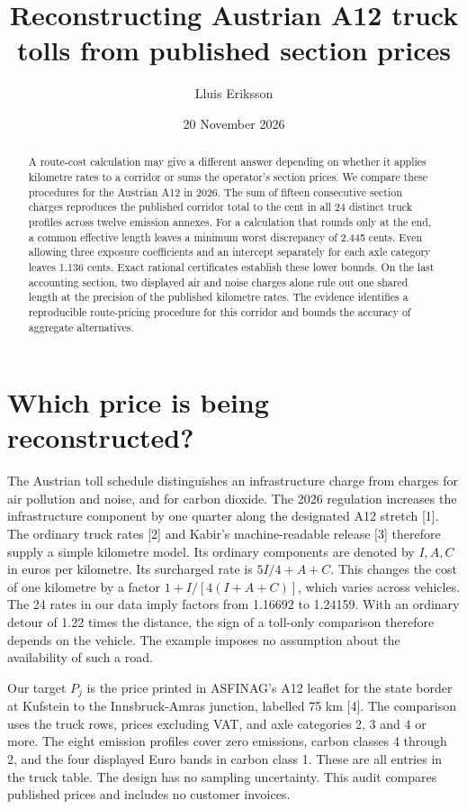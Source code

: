 \documentclass[11pt]{article}
\title{Reconstructing Austrian A12 truck tolls from published section prices}
\author{Lluis Eriksson}
\date{20 November 2026}
\begin{document}
\maketitle
\begin{abstract}
A route-cost calculation may give a different answer depending on whether it applies kilometre rates to a corridor or sums the operator's section prices. We compare these procedures for the Austrian A12 in 2026. The sum of fifteen consecutive section charges reproduces the published corridor total to the cent in all 24 distinct truck profiles across twelve emission annexes. For a calculation that rounds only at the end, a common effective length leaves a minimum worst discrepancy of 2.445 cents. Even allowing three exposure coefficients and an intercept separately for each axle category leaves 1.136 cents. Exact rational certificates establish these lower bounds. On the last accounting section, two displayed air and noise charges alone rule out one shared length at the precision of the published kilometre rates. The evidence identifies a reproducible route-pricing procedure for this corridor and bounds the accuracy of aggregate alternatives.
\end{abstract}

\section{Which price is being reconstructed?}
The Austrian toll schedule distinguishes an infrastructure charge from charges for air pollution and noise, and for carbon dioxide. The 2026 regulation increases the infrastructure component by one quarter along the designated A12 stretch [1]. The ordinary truck rates [2] and Kabir's machine-readable release [3] therefore supply a simple kilometre model. Its ordinary components are denoted by $I,A,C$ in euros per kilometre. Its surcharged rate is $5I/4+A+C$. This changes the cost of one kilometre by a factor $1+I/[4(I+A+C)]$, which varies across vehicles. The 24 rates in our data imply factors from 1.16692 to 1.24159. With an ordinary detour of 1.22 times the distance, the sign of a toll-only comparison therefore depends on the vehicle. The example imposes no assumption about the availability of such a road.

Our target $P_j$ is the price printed in ASFINAG's A12 leaflet for the state border at Kufstein to the Innsbruck-Amras junction, labelled 75 km [4]. The comparison uses the truck rows, prices excluding VAT, and axle categories 2, 3 and 4 or more. The eight emission profiles cover zero emissions, carbon classes 4 through 2, and the four displayed Euro bands in carbon class 1. These are all entries in the truck table. The design has no sampling uncertainty. This audit compares published prices and includes no customer invoices.
\end{document}
